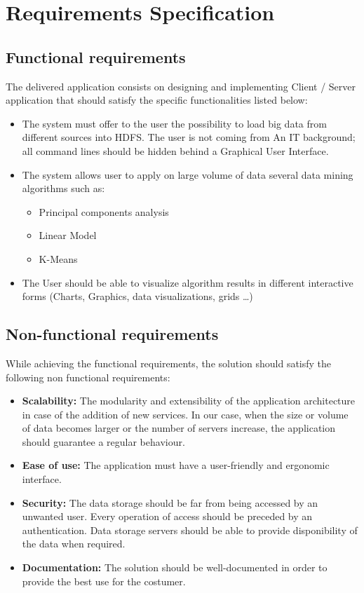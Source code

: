 \documentclass[a4paper]{report}
\begin{document}
\chapter{Requirements Specification}
\section{Functional requirements}

The delivered application consists on designing and implementing Client / Server application that should satisfy the specific functionalities listed below:
\begin{itemize}
\item The system must offer to the user the possibility to load big data from different sources into HDFS. The user is not coming from An IT background; all command lines should be hidden behind a Graphical User Interface. 
\item The system allows user to apply on large volume of data several data mining algorithms such as:
\begin{itemize}
\item Principal components analysis 
\item Linear Model
\item K-Means
\end{itemize}
\item The User should be able to visualize algorithm results in different interactive forms (Charts, Graphics, data visualizations, grids …)
\end{itemize}
\section{Non-functional requirements}

While achieving the functional requirements, the solution should satisfy the following non functional
requirements:
\begin{itemize}
\item \textbf{Scalability:} The modularity and extensibility of the application architecture in case of the addition of new services. In our case, when
the size or volume of data becomes larger or the number of servers increase, the application should guarantee a regular behaviour.
\item \textbf{Ease of use:} The application must have a user-friendly and ergonomic interface.
\item \textbf{Security:} The data storage should be far from being accessed by an unwanted user. Every operation of access should be preceded by an authentication. Data storage servers should be able to provide disponibility of the data when required.
\item \textbf{Documentation:} The solution should be well-documented in order to provide the best use for the costumer.
\end{itemize}
\end{document}

